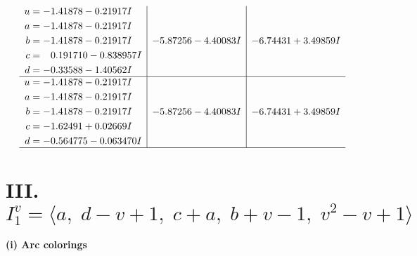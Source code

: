 \documentclass[1p]{elsarticle_modified}
\theoremstyle{definition}
\begin{document}
$$\begin{array}{c|c|c}
\begin{aligned}
u &= -1.41878 - 0.21917 I \\
a &= -1.41878 - 0.21917 I \\
b &= -1.41878 - 0.21917 I \\
c &= \phantom{-}0.191710 - 0.838957 I \\
d &= -0.33588 - 1.40562 I\end{aligned}
 & -5.87256 - 4.40083 I & -6.74431 + 3.49859 I \\ \hline\begin{aligned}
u &= -1.41878 - 0.21917 I \\
a &= -1.41878 - 0.21917 I \\
b &= -1.41878 - 0.21917 I \\
c &= -1.62491 + 0.02669 I \\
d &= -0.564775 - 0.063470 I\end{aligned}
 & -5.87256 - 4.40083 I & -6.74431 + 3.49859 I\\
 \hline 
 \end{array}$$\newpage\newpage\renewcommand{\arraystretch}{1}
\centering \section*{III. $I^v_{1}= \langle a,\;d- v+1,\;c+a,\;b+v-1,\;v^2- v+1 \rangle$}
\flushleft \textbf{(i) Arc colorings}\\
\end{document}
